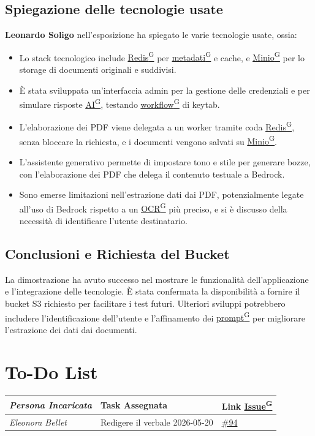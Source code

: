 \documentclass[a4paper,12pt]{article}
\providecommand{\glslink}[2]{\href{https://alittlebyte-19.github.io/Documentazione/glossario.html\#gls-#1}{\underline{#2}\textsuperscript{\scriptsize G}}}
\begin{document}
\subsection{Spiegazione delle tecnologie usate}
\textbf{Leonardo Soligo} nell'esposizione ha spiegato le varie tecnologie usate, ossia:
\begin{itemize}
    \item Lo stack tecnologico include \glslink{redis}{Redis} per \glslink{metadati}{metadati} e cache, e \glslink{minio}{Minio} per lo storage di documenti originali e suddivisi.
    \item È stata sviluppata un'interfaccia admin per la gestione delle credenziali e per simulare risposte \glslink{intelligenza-artificiale-ai}{AI}, testando \glslink{workflow}{workflow} di keytab.
    \item L'elaborazione dei PDF viene delegata a un worker tramite coda \glslink{redis}{Redis}, senza bloccare la richiesta, e i documenti vengono salvati su \glslink{minio}{Minio}.
    \item L'assistente generativo permette di impostare tono e stile per generare bozze, con l'elaborazione dei PDF che delega il contenuto testuale a Bedrock.
    \item Sono emerse limitazioni nell'estrazione dati dai PDF, potenzialmente legate all'uso di Bedrock rispetto a un \glslink{ocr-riconoscimento-ottico-dei-caratteri}{OCR} più preciso, e si è discusso della necessità di identificare l'utente destinatario.
\end{itemize}

\subsection{Conclusioni e Richiesta del Bucket}
La dimostrazione ha avuto successo nel mostrare le funzionalità dell'applicazione e l'integrazione delle tecnologie. È stata confermata la disponibilità a fornire il bucket S3 richiesto per facilitare i test futuri. Ulteriori sviluppi potrebbero includere l'identificazione dell'utente e l'affinamento dei \glslink{prompt}{prompt} per migliorare l'estrazione dei dati dai documenti.

\section{To-Do List}
\begin{table}[h]
    \centering
    \begin{tabular}{|p{4.5cm}|p{5cm}|l|}
    \hline
        \rowcolor{lightgray}\textit{\textbf{Persona Incaricata}}  & \textbf{Task Assegnata} &\textbf{Link \glslink{issue}{Issue}} \\
    \hline
        \textit{Eleonora Bellet} & Redigere il verbale 2026-05-20 & \href{https://github.com/aLittleByte-19/Documentazione/issues/94}{\#94} \\
    \hline
    \end{tabular}
    \label{tab:placeholder}
\end{table}
\end{document}
